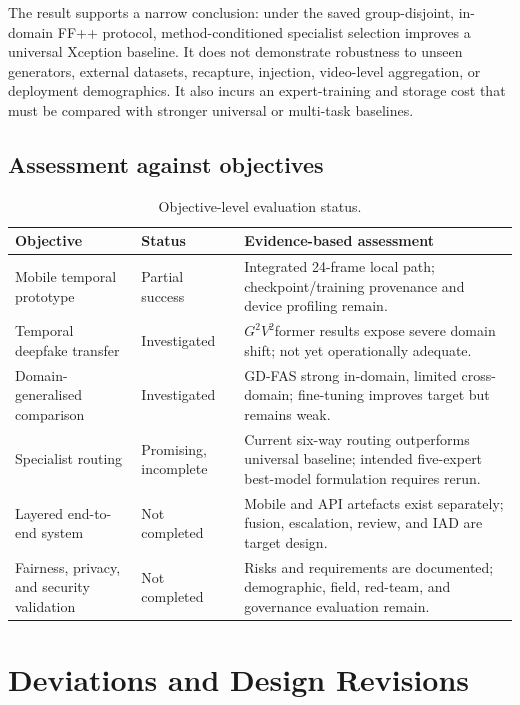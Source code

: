 The result supports a narrow conclusion: under the saved group-disjoint,
in-domain FF++ protocol, method-conditioned specialist selection improves a
universal Xception baseline. It does not demonstrate robustness to unseen
generators, external datasets, recapture, injection, video-level aggregation, or
deployment demographics. It also incurs an expert-training and storage cost that
must be compared with stronger universal or multi-task baselines.

\subsection{Assessment against objectives}

\begin{table}[H]
\centering
\caption{Objective-level evaluation status.}
\label{tab:objective-status}
\begin{tabularx}{\textwidth}{@{}p{38mm}p{24mm}Y@{}}
\toprule
Objective & Status & Evidence-based assessment \\
\midrule
Mobile temporal prototype & Partial success & Integrated 24-frame local path;
checkpoint/training provenance and device profiling remain. \\
Temporal deepfake transfer & Investigated & $G^2V^2$former results expose severe
domain shift; not yet operationally adequate. \\
Domain-generalised comparison & Investigated & GD-FAS strong in-domain, limited
cross-domain; fine-tuning improves target but remains weak. \\
Specialist routing & Promising, incomplete & Current six-way routing outperforms
universal baseline; intended five-expert best-model formulation requires rerun. \\
Layered end-to-end system & Not completed & Mobile and API artefacts exist
separately; fusion, escalation, review, and IAD are target design. \\
Fairness, privacy, and security validation & Not completed & Risks and requirements are
documented; demographic, field, red-team, and governance evaluation remain. \\
\bottomrule
\end{tabularx}
\end{table}

\section{Deviations and Design Revisions}

